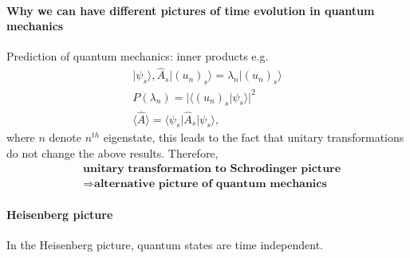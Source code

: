 \documentclass[../../note.tex]{subfiles}
\begin{document}
\paragraph{Why we can have different pictures of time evolution in quantum mechanics}
Prediction of quantum mechanics: inner products e.g.
\begin{align}
    \vert \psi_s \rangle, \hat{A}_s \vert (u_n)_s \rangle = \lambda_n \vert (u_n)_s \rangle \\
    P(\lambda_n) = \vert \langle (u_n)_s \vert \psi_s \rangle \vert^2 \\
    \langle \hat{A} \rangle = \langle \psi_s \vert \hat{A}_s \vert \psi_s \rangle,
\end{align}
where $n$ denote $n^{th}$ eigenstate, this leads to the fact that unitary transformations do not change the above results. Therefore,
\begin{align}
    &\textbf{unitary transformation to Schrodinger picture} \\
    &\Longrightarrow \textbf{alternative picture of quantum mechanics}
\end{align}

\paragraph{Heisenberg picture} 
\begin{definition}
    \label{def: heisenberg picture}
    In the Heisenberg picture, quantum states are time independent.
\end{definition}
\end{document}
